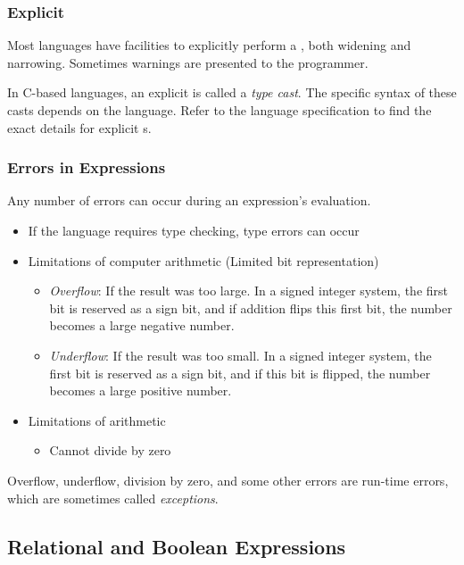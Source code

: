 \subsubsection{Explicit }\label{subsubsec:Explicit_Type_Conversion}
Most languages have facilities to explicitly perform a , both widening and narrowing.
Sometimes warnings are presented to the programmer.

In C-based languages, an explicit  is called a \emph{type cast}.
The specific syntax of these casts depends on the language.
Refer to the language specification to find the exact details for explicit s.

\subsubsection{Errors in Expressions}\label{subsubsec:Errors_in_Expressions}
Any number of errors can occur during an expression's evaluation.
\begin{itemize}[noitemsep]
\item If the language requires type checking, type errors can occur
\item Limitations of computer arithmetic (Limited bit representation)
  \begin{itemize}[noitemsep]
  \item \emph{Overflow}: If the result was too large. In a signed integer system, the first bit is reserved as a sign bit, and if addition flips this first bit, the number becomes a large negative number.
  \item \emph{Underflow}: If the result was too small. In a signed integer system, the first bit is reserved as a sign bit, and if this bit is flipped, the number becomes a large positive number.
  \end{itemize}
\item Limitations of arithmetic
  \begin{itemize}[noitemsep]
  \item Cannot divide by zero
  \end{itemize}
\end{itemize}

Overflow, underflow, division by zero, and some other errors are run-time errors, which are sometimes called \emph{exceptions}.

\subsection{Relational and Boolean Expressions}\label{subsec:Relational_Boolean_Expressions}
